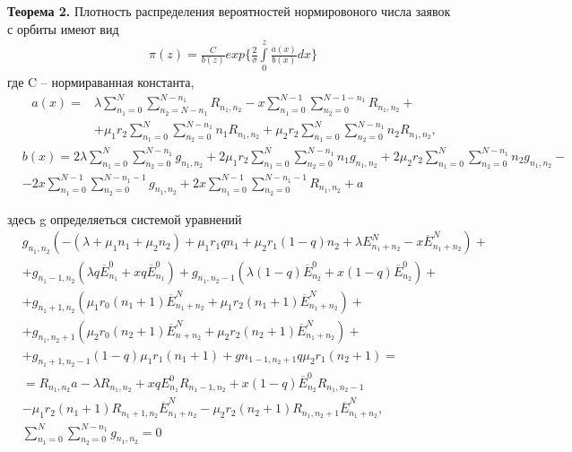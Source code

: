 \textbf{ Теорема 2.} Плотность распределения вероятностей нормировоного числа заявок с орбиты имеют вид
\begin{align}
\pi (z)= \frac{C}{b(z)}exp\{\frac{2}{\sigma} \int\limits_0^z \frac{a(x)}{b(x)}dx\}
\end{align} 
где C – нормираванная константа,
\begin{equation*}
	\begin{aligned}\
		a(x)=&\lambda \sum_{n_1=0}^N\sum_{n_2=N-n_1}^{N-n_1} 
		R_{n_{1}, n_{2}}
		- x\sum_{n_1=0}^{N-1}\sum_{n_2=0}^{N-1-n_1} 
		R_{n_{1}, n_{2}}+\\
		&+\mu_1 r_2 \sum_{n_1=0}^{N}\sum_{n_2=0}^{N-n_1} 
		n_1 R_{n_{1}, n_{2}}
		+\mu_2 r_2 \sum_{n_1=0}^{N}\sum_{n_2=0}^{N-n_1} 
		n_2 R_{n_{1}, n_{2}},
	\end{aligned}
\end{equation*}
\begin{equation*}
	\begin{aligned}
		&b(x)=2\lambda\sum_{n_1=0}^N\sum_{n_2=0}^{N-n_1}g_{n_{1}, n_{2}}+2\mu_{1}r_{2}\sum_{n_1=0}^{N}\sum_{n_2=0}^{N-n_1}n_{1}g_{n_{1}, n_{2}}+2\mu_{2}r_{2}\sum_{n_1=0}^{N}\sum_{n_2=0}^{N-n_1}n_{2}g_{n_{1}, n_{2}}-\\
		&-2x\sum_{n_1=0}^{N-1}\sum_{n_2=0}^{N-n_1-1}g_{n_{1}, n_{2}}+2x\sum_{n_1=0}^{N-1}\sum_{n_2=0}^{N-n_1-1}R_{n_{1}, n_{2}}+a
	\end{aligned}
\end{equation*}

здесь g определяеться системой уравнений
\begin{equation*}\label{sistemG}
	\begin{split}
		&g_{n_{1}, n_{2}}(-(\lambda +\mu_{1} n_{1}+\mu_{2} n_{2})+\mu_{1} r_{1} q n_{1}+ \mu_{2} r_{1} (1-q) n_{2} + \lambda E_{n_{1} + n_{2}}^{N} - x\overline{E}_{n_{1} + n_{2}}^{N})+\\
		&+g_{n_{1}-1, n_{2}}(\lambda q \overline{E}_{n_{1}}^{0}+xq\overline{E}_{n_{1}}^{0})+g_{n_{1}, n_{2}-1}(\lambda (1-q) \overline{E}_{n_{2}}^{0}+x(1-q)\overline{E}_{n_{2}}^{0})+\\
		&+g_{n_{1}+1, n_{2}}(\mu_{1} r_{0}(n_{1}+1)\overline{E}_{n_{1} + n_{2}}^{N} + \mu_{1} r_{2}(n_{1}+1)\overline{E}_{n_{1} + n_{2}}^{N})+\\
		&+g_{n_{1}, n_{2}+1}(\mu_{2} r_{0}(n_{2}+1)\overline{E}_{n_{} + n_{2}}^{N} + \mu_{2} r_{2}(n_{2}+1)\overline{E}_{n_{1} + n_{2}}^{N})+\\
		&+g_{n_{1}+1, n_{2}-1}(1-q)\mu_{1} r_{1} (n_{1}+1)+g{n_{1-1, n_{2}+1}}q\mu_{2}r_{1}(n_{2}+1)=\\
		&=R_{n_{1}, n_{2}}a-\lambda R_{n_{1}, n_{2}} +x q E_{n_{1}}^{0} R_{n_{1}-1, n_{2}}+x (1-q) \overline{E}_{n_{2}}^{0} R_{n_{1}, n_{2}-1}\\
		&-\mu_{1}r_{2}(n_{1}+1)R_{n_{1}+1, n_{2}}\overline{E}_{n_{1} + n_{2}}^{N}-\mu_{2}r_{2}(n_{2}+1)R_{n_{1}, n_{2}+1}\overline{E}_{n_{1} + n_{2}}^{N},\\
		&\sum_{n_{1}=0}^{N}\sum_{n_{2}=0}^{N-n_{1}}g_{n_{1}, n_{2}}=0
	\end{split}
\end{equation*}

